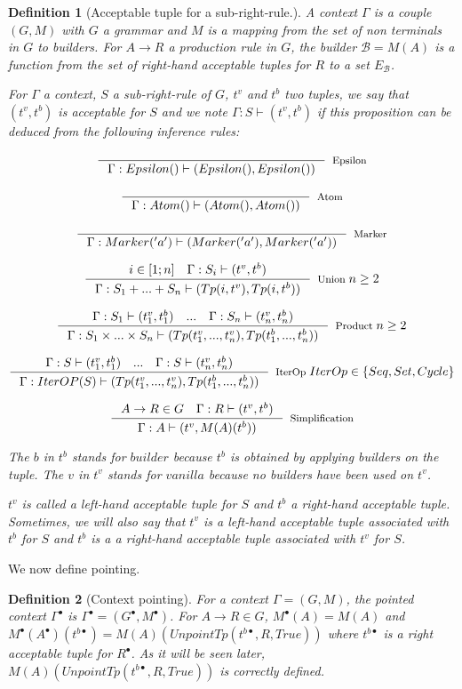 \documentclass{article}
\newtheorem{definition}{Definition}
\begin{document}
\begin{definition}[Acceptable tuple for a sub-right-rule.]
A context $\Gamma$ is a couple $(G, M)$ with $G$ a grammar and $M$ is a mapping from the set of non terminals in $G$ to builders. For $A \rightarrow R$ a production rule in $G$, the builder $\mathcal{B} = M(A)$ is a function from the set of right-hand acceptable tuples for $R$ to a set $E_\mathcal{B}$.

For $\Gamma$ a context, $S$ a sub-right-rule of $G$, $t^v$ and $t^b$ two tuples, we say that $(t^v, t^b)$ is acceptable for $S$ and we note $\Gamma: S\vdash (t^v, t^b)$ if this proposition can be deduced from the following inference rules:

$$\inference{}{\Gamma:Epsilon()\vdash (Epsilon(), Epsilon())}[Epsilon]$$

$$\inference{}{\Gamma:Atom()\vdash (Atom(), Atom())}[Atom]$$

$$\inference{}{\Gamma:Marker('a')\vdash (Marker('a'), Marker('a'))}[Marker]$$

$$\inference{i \in [1; n] \quad \Gamma:S_i\vdash (t^v, t^b)}{\Gamma:S_1 + ... + S_n\vdash (Tp(i, t^v), Tp(i, t^b))}[Union]\;n\ge 2$$

$$\inference{\Gamma:S_1\vdash (t^v_1, t^b_1)\quad ...\quad \Gamma:S_n \vdash (t^v_n, t^b_n)}{\Gamma:S_1 \times ... \times S_n\vdash (Tp(t^v_1,...,t^v_n), Tp(t^b_1, ..., t^b_n))}[Product]\;n\ge 2$$

$$\inference{\Gamma:S \vdash (t^v_1, t^b_1)\quad ...\quad \Gamma:S \vdash (t^v_n, t^b_n)}{\Gamma:IterOP(S) \vdash (Tp(t^v_1,...,t^v_n), Tp(t^b_1,...,t^b_n))}[IterOp]\;IterOp \in \{Seq, Set, Cycle\}$$

$$\inference{A \rightarrow R \in G \quad \Gamma:R\vdash (t^v, t^b)}{\Gamma:A\vdash (t^v, M(A)(t^b))}[Simplification]$$

The $b$ in $t^b$ stands for $builder$ because $t^b$ is obtained by applying builders on the tuple. The $v$ in $t^v$ stands for $vanilla$ because no builders have been used on $t^v$.

$t^v$ is called a left-hand acceptable tuple for $S$ and $t^b$ a right-hand acceptable tuple. Sometimes, we will also say that $t^v$ is a left-hand acceptable tuple associated with $t^b$ for $S$ and $t^b$ is a a right-hand acceptable tuple associated with $t^v$ for $S$.
\end{definition}

We now define pointing.
\begin{definition}[Context pointing]
For a context $\Gamma = (G, M)$, the pointed context $\Gamma^{\bullet}$ is $\Gamma^{\bullet} = (G^{\bullet}, M^{\bullet})$. For $A \rightarrow R \in G$, $M^{\bullet}(A) = M(A)$ and $M^{\bullet}(A^{\bullet})(t^{b\bullet}) = M(A)(UnpointTp(t^{b\bullet}, R, True))$ where $t^{b\bullet}$ is a right acceptable tuple for $R^{\bullet}$. As it will be seen later, $M(A)(UnpointTp(t^{b\bullet}, R, True))$ is correctly defined.
\end{definition}
\end{document}
